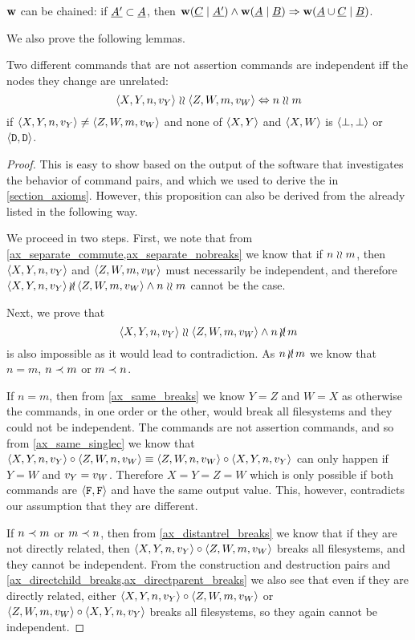 \begin{mycor}\label{workschained}
$\mathbf{w}$ can be chained:
if $\underline{A'}\subset\underline{A}$, then
$ \mathbf{w}({\underline{C}}\mathrel{|}{\underline{A'}}) \wedge \mathbf{w}({\underline{A}}\mathrel{|}{\underline{B}}) \Rightarrow \mathbf{w}({\underline{A}\cup\underline{C}}\mathrel{|}{\underline{B}})$.
\end{mycor}

We also prove the following lemmas.

\begin{mylem}\label{unrelated_is_independent}
Two different commands that are not assertion commands are independent iff the nodes they change are unrelated:
\[ \langle{X,Y,n,v_Y}\rangle\mathrel{\wr\wr}\langle{Z,W,m,v_W}\rangle \Leftrightarrow n\mathrel{\wr\wr} m \]
if $\langle{X,Y,n,v_Y}\rangle\neq\langle{Z,W,m,v_W}\rangle$ and none of $\langle{X,Y}\rangle$ and $\langle{X,W}\rangle$ is $\langle{\bot,\bot}\rangle$ or $\langle{\mathtt{D},\mathtt{D}}\rangle$.
\end{mylem}
\begin{proof}
This is easy to show based on the output of the software that investigates the behavior of command pairs,
and which we used to derive the  in \cref{section_axioms}.
However, this proposition can also be derived from the  already listed
in the following way.

We proceed in two steps. First, we note that
from \cref{ax_separate_commute,ax_separate_nobreaks} we know that
if $n\mathrel{\wr\wr} m$, then $\langle{X,Y,n,v_Y}\rangle$ and $\langle{Z,W,m,v_W}\rangle$ must necessarily be independent, and therefore
$ \cxynv\nindep\czwmv \wedge n\unrel m $ cannot be the case.

Next, we prove that
\[ \cxynv\indep\czwmv \wedge n\nunrel m \] is also impossible as it would lead to contradiction.
As $n\nunrel m$
we know that $n=m$, $n\prec m$ or $m\prec n$.

If $n=m$, then from \cref{ax_same_breaks} we know $Y=Z$ and $W=X$
as otherwise the commands, in one order or the other, would break all filesystems
and they could not be independent.
The commands are not assertion commands, and so from \cref{ax_same_singlec}
we know that $\langle{X,Y,n,v_Y}\rangle\circ\langle{Z,W,n,v_W}\rangle\equiv\langle{Z,W,n,v_W}\rangle\circ\langle{X,Y,n,v_Y}\rangle$ can only happen if $Y=W$ and $v_Y=v_W$.
Therefore $X=Y=Z=W$ which is only possible if both commands are $\langle{\mathtt{F},\mathtt{F}}\rangle$ and have the same
output value. This, however, contradicts our assumption that they are different.

If $n\prec m$ or $m\prec n$, then
from \cref{ax_distantrel_breaks} we know that if they are not directly related,
then $\langle{X,Y,n,v_Y}\rangle\circ\langle{Z,W,m,v_W}\rangle$ breaks all filesystems, and they cannot be independent.
From the construction and destruction pairs and 
\cref{ax_directchild_breaks,ax_directparent_breaks} we also see that
even if they are directly related, either
$\langle{X,Y,n,v_Y}\rangle\circ\langle{Z,W,m,v_W}\rangle$ or $\langle{Z,W,m,v_W}\rangle\circ\langle{X,Y,n,v_Y}\rangle$ 
breaks all filesystems, so they again cannot be independent.
\end{proof}

